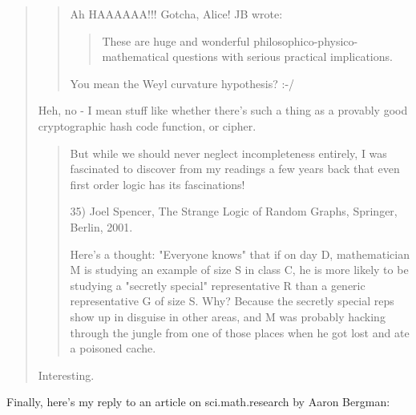 \begin{quote}
\begin{quote}
Ah HAAAAAA!!!  Gotcha, Alice!
JB wrote:
\begin{quote}
These are huge and wonderful philosophico-physico-mathematical questions 
 with serious practical implications.
\end{quote}
You mean the Weyl curvature hypothesis? :-/
\end{quote}
Heh, no - I mean stuff like whether there's such a thing as a provably 
good cryptographic hash code function, or cipher.  

\begin{quote}
But while we should never neglect incompleteness entirely, I was 
fascinated to discover from my readings a few years back that even first 
order logic has its fascinations!

35) Joel Spencer, The Strange Logic of Random Graphs, Springer, Berlin, 2001.

Here's a thought: "Everyone knows" that if on day D, mathematician M is 
studying an example of size S in class C, he is more likely to be studying 
a "secretly special" representative R than a generic representative G of 
size S.  Why? Because the secretly special reps show up in disguise in 
other areas, and M was probably hacking through the jungle from one of 
those places when he got lost and ate a poisoned cache.
\end{quote}
Interesting.
\end{quote}

Finally, here's my reply to an article on sci.math.research by
Aaron Bergman:

